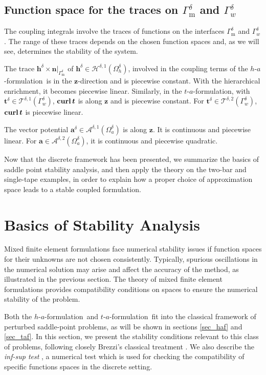 \documentclass[journal]{IEEEtran}
\renewcommand{\vec}[1]{\boldsymbol{#1}} %
\newcommand{\curl}{\text{\textbf{curl}}\, }
\renewcommand{\a}{\vec a}
\renewcommand{\t}{\vec t}
\newcommand{\n}{\vec n}
\newcommand{\haf}{$h$-$a$-formulation\ }
\newcommand{\taf}{$t$-$a$-formulation\ }
\newcommand{\tafOnly}{$t$-$a$-formulation}
\newcommand{\Oad}{\Omega_a^\delta}
\newcommand{\Ohd}{\Omega_h^\delta}
\newcommand{\Gmd}{\Gamma_\text{m}^\delta}
\newcommand{\Gwd}{\Gamma_w^\delta}
\newcommand{\hspdone}{\mathcal{H}^{\delta,1}}
\newcommand{\aspdone}{\mathcal{A}^{\delta,1}}
\newcommand{\tspdone}{\mathcal{T}^{\delta,1}}
\newcommand{\aspdtwo}{\mathcal{A}^{\delta,2}}
\newcommand{\tspdtwo}{\mathcal{T}^{\delta,2}}
\newcommand{\ad}{\vec a^{\delta}}
\newcommand{\td}{\vec t^{\delta}}
\newcommand{\hd}{\vec h^{\delta}}
\begin{document}
\subsection{Function space for the traces on $\Gmd$ and $\Gwd$}

The coupling integrals involve the traces of functions on the interfaces $\Gmd$ and $\Gwd$. The range of these traces depends on the chosen function spaces and, as we will see, determines the stability of the system.

The trace $\hd\times \n|_{\Gmd}$ of $\hd\in \hspdone(\Ohd)$, involved in the coupling terms of the \haf is in the $\vec z$-direction and is piecewise constant. With the hierarchical enrichment, it becomes piecewise linear. Similarly, in the \tafOnly, with $\td\in \tspdone(\Gwd)$, $\curl \t$ is along $\vec z$ and is piecewise constant. For $\td\in \tspdtwo(\Gwd)$, $\curl\t$ is piecewise linear.

The vector potential $\ad \in\aspdone(\Oad)$ is along $\vec z$. It is continuous and piecewise linear. For $\a \in\aspdtwo(\Oad)$, it is continuous and piecewise quadratic.

Now that the discrete framework has been presented, we summarize the basics of saddle point stability analysis, and then apply the theory on the two-bar and single-tape examples, in order to explain how a proper choice of approximation space leads to a stable coupled formulation.

\section{Basics of Stability Analysis}\label{sec_stabilityAnalysis}

Mixed finite element formulations face numerical stability issues if function spaces for their unknowns are not chosen consistently. Typically, spurious oscillations in the numerical solution may arise and affect the accuracy of the method, as illustrated in the previous section. The theory of mixed finite element formulations \cite{brezziBook} provides compatibility conditions on spaces to ensure the numerical stability of the problem.

Both the \haf and \taf fit into the classical framework of perturbed saddle-point problems, as will be shown in sections \ref{sec_haf} and \ref{sec_taf}. In this section, we present the stability conditions relevant to this class of problems, following closely Brezzi's classical treatment \cite{brezziBook}. We also describe the \textit{inf-sup test} \cite{chapelle1993inf}, a numerical test which is used for checking the compatibility of specific functions spaces in the discrete setting.
\end{document}
